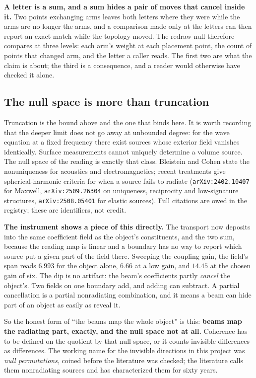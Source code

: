 \textbf{A letter is a sum, and a sum hides a pair of moves that cancel inside it.} Two points exchanging arms leaves both letters where they were while the arms are no longer the arms, and a comparison made only at the letters can then report an exact match while the topology moved. The redraw null therefore compares at three levels: each arm's weight at each placement point, the count of points that changed arm, and the letter a caller reads. The first two are what the claim is about; the third is a consequence, and a reader would otherwise have checked it alone.

\subsection{The null space is more than truncation}

Truncation is the bound above and the one that binds here. It is worth recording that the deeper limit does not go away at unbounded degree: for the wave equation at a fixed frequency there exist sources whose exterior field vanishes identically. Surface measurements cannot uniquely determine a volume source. The null space of the reading is exactly that class. Bleistein and Cohen state the nonuniqueness for acoustics and electromagnetics; recent treatments give spherical-harmonic criteria for when a source fails to radiate (\texttt{arXiv:2402.10407} for Maxwell, \texttt{arXiv:2509.26304} on uniqueness, reciprocity and low-signature structures, \texttt{arXiv:2508.05401} for elastic sources). Full citations are owed in the registry; these are identifiers, not credit.

\textbf{The instrument shows a piece of this directly.} The transport now deposits into the same coefficient field as the object's constituents, and the two sum, because the reading map is linear and a boundary has no way to report which source put a given part of the field there. Sweeping the coupling gain, the field's span reads \(6.993\) for the object alone, \(6.66\) at a low gain, and \(14.45\) at the chosen gain of six. The dip is no artifact: the beam's coefficients partly \emph{cancel} the object's. Two fields on one boundary add, and adding can subtract. A partial cancellation is a partial nonradiating combination, and it means a beam can hide part of an object as easily as reveal it.

So the honest form of ``the beams map the whole object'' is this: \textbf{beams map the radiating part, exactly, and the null space not at all.} Coherence has to be defined on the quotient by that null space, or it counts invisible differences as differences. The working name for the invisible directions in this project was \emph{null permutations}, coined before the literature was checked; the literature calls them nonradiating sources and has characterized them for sixty years.

